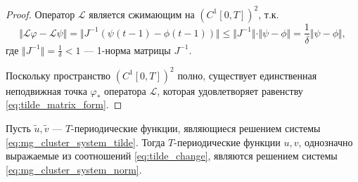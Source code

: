 \begin{proof}
	Оператор $\mathcal{L}$ является сжимающим на $(C^1[0, T])^2$, т.к.
	\[\Vert\mathcal{L}\varphi - \mathcal{L}\psi\Vert = \Vert J^{-1} (\psi(t - 1) - \phi(t - 1)) \Vert \leq \Vert J^{-1} \Vert \cdot \Vert \psi - \phi \Vert = \dfrac{1}{\delta} \Vert \psi - \phi \Vert,\]
	где $\Vert J^{-1} \Vert = \frac{1}{\delta} < 1$ --- 1-норма матрицы $J^{-1}$.
	
	Поскольку пространство $(C^1[0, T])^2$ полно, существует единственная неподвижная точка $\varphi_*$ оператора $\mathcal{L}$, которая удовлетворяет равенству \eqref{eq:tilde_matrix_form}.
\end{proof}

\begin{lemma}
	\label{lm:uv_inverse_system}
	Пусть $\tilde{u}, \tilde{v}$ --- $T$-периодические функции, являющиеся решением системы \eqref{eq:mg_cluster_system_tilde}. Тогда $T$-периодические функции $u, v$, однозначно выражаемые из соотношений \eqref{eq:tilde_change}, являются решением системы \eqref{eq:mg_cluster_system_norm}.
\end{lemma}
